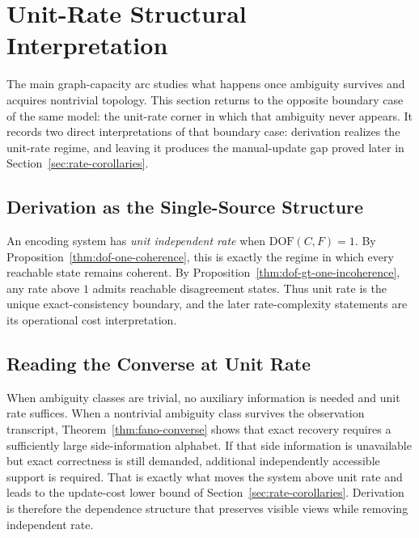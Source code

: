 \section{Unit-Rate Structural Interpretation}\label{sec:ssot}

The main graph-capacity arc studies what happens once ambiguity survives and acquires nontrivial topology. This section returns to the opposite boundary case of the same model: the unit-rate corner in which that ambiguity never appears. It records two direct interpretations of that boundary case: derivation realizes the unit-rate regime, and leaving it produces the manual-update gap proved later in Section~\ref{sec:rate-corollaries}.

\subsection{Derivation as the Single-Source Structure}\label{sec:ssot-def}

An encoding system has \emph{unit independent rate} when $\text{DOF}(C,F)=1$. By Proposition~\ref{thm:dof-one-coherence}, this is exactly the regime in which every reachable state remains coherent. By Proposition~\ref{thm:dof-gt-one-incoherence}, any rate above $1$ admits reachable disagreement states. Thus unit rate is the unique exact-consistency boundary, and the later rate-complexity statements are its operational cost interpretation.

\subsection{Reading the Converse at Unit Rate}\label{sec:info-sketches}

When ambiguity classes are trivial, no auxiliary information is needed and unit rate suffices. When a nontrivial ambiguity class survives the observation transcript, Theorem~\ref{thm:fano-converse} shows that exact recovery requires a sufficiently large side-information alphabet. If that side information is unavailable but exact correctness is still demanded, additional independently accessible support is required. That is exactly what moves the system above unit rate and leads to the update-cost lower bound of Section~\ref{sec:rate-corollaries}. Derivation is therefore the dependence structure that preserves visible views while removing independent rate.

